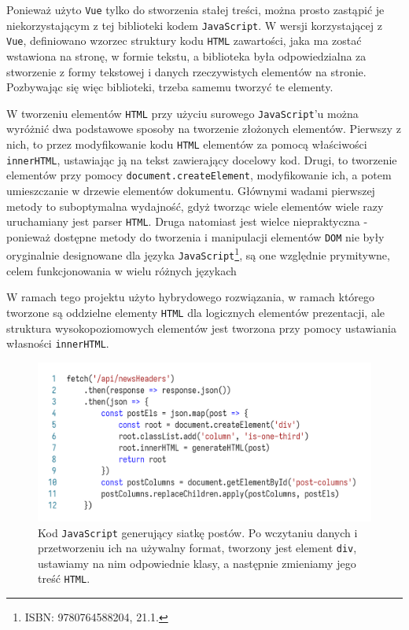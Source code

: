\documentclass[licencjacka]{pracadypl}
\begin{document}
Ponieważ użyto \texttt{Vue} tylko do stworzenia stałej treści, można prosto zastąpić je niekorzystającym z tej biblioteki kodem \texttt{JavaScript}. W wersji korzystającej z \texttt{Vue}, definiowano wzorzec struktury kodu \texttt{HTML} zawartości, jaka ma zostać wstawiona na stronę, w formie tekstu, a biblioteka była odpowiedzialna za stworzenie z formy tekstowej i danych rzeczywistych elementów na stronie. Pozbywając się więc biblioteki, trzeba samemu tworzyć te elementy.

W tworzeniu elementów \texttt{HTML} przy użyciu surowego \texttt{JavaScript}'u można wyróżnić dwa podstawowe sposoby na tworzenie złożonych elementów. Pierwszy z nich, to przez modyfikowanie kodu \texttt{HTML} elementów za pomocą właściwości \texttt{innerHTML}, ustawiając ją na tekst zawierający docelowy kod. Drugi, to tworzenie elementów przy pomocy \texttt{document.createElement}, modyfikowanie ich, a potem umieszczanie w drzewie elementów dokumentu. Głównymi wadami pierwszej metody to suboptymalna wydajność, gdyż tworząc wiele elementów wiele razy uruchamiany jest parser \texttt{HTML}. Druga natomiast jest wielce niepraktyczna - ponieważ dostępne metody do tworzenia i manipulacji elementów \texttt{DOM} nie były oryginalnie designowane dla języka \texttt{JavaScript}\footnote{ISBN: 9780764588204, 21.1.}, są one względnie prymitywne, celem funkcjonowania w wielu różnych językach

W ramach tego projektu użyto hybrydowego rozwiązania, w ramach którego tworzone są oddzielne elementy \texttt{HTML} dla logicznych elementów prezentacji, ale struktura wysokopoziomowych elementów jest tworzona przy pomocy ustawiania własności \texttt{innerHTML}.

\begin{figure}[H]
  \centering
  \includegraphics[width=\linewidth]{images/code-js-elem-gen.png}
  \caption{Kod \texttt{JavaScript} generujący siatkę postów. Po wczytaniu danych i przetworzeniu ich na używalny format, tworzony jest element \texttt{div}, ustawiamy na nim odpowiednie klasy, a następnie zmieniamy jego treść \texttt{HTML}.}
  \label{fig:code-js-elem-gen}
\end{figure}
\end{document}
